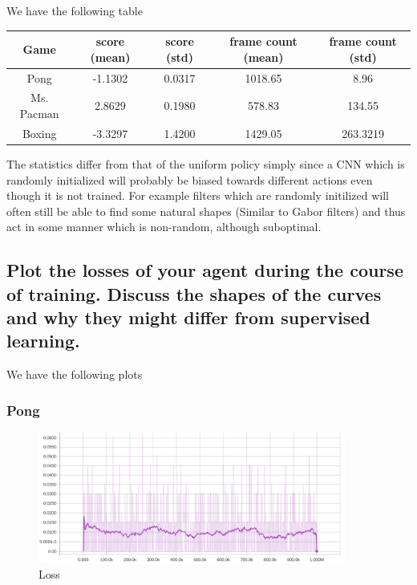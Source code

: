 \documentclass{article}
\begin{document}
We have the following table

\begin{center}
  \begin{tabular}{ |c|c|c|c|c| } 
    \hline
    Game & score (mean) & score (std) & frame count (mean) & frame count (std) \\
    \hline
    Pong & -1.1302 & 0.0317 & 1018.65 & 8.96 \\
    \hline
    Ms. Pacman & 2.8629 & 0.1980 & 578.83 & 134.55 \\
    \hline
    Boxing & -3.3297 & 1.4200 & 1429.05 & 263.3219 \\
    \hline
  \end{tabular}
\end{center}

The statistics differ from that of the uniform policy simply since a CNN which
is randomly initialized will probably be biased towards different actions even
though it is not trained. For example filters which are randomly initilized will
often still be able to find some natural shapes (Similar to Gabor filters) and
thus act in some manner which is non-random, although suboptimal.

\subsection{Plot the losses of your agent during the course of training. Discuss
  the shapes of the curves and why they might differ from supervised learning.}

We have the following plots

\subsubsection{Pong}

\begin{figure}[H]
  \centering
  \includegraphics[width=0.9\textwidth]{B3/pong_loss.png}
  \caption{Loss}
\end{figure}
\end{document}
